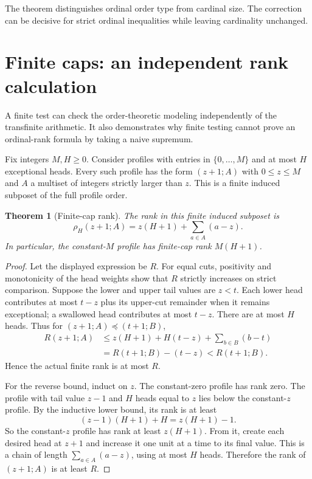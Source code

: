 \documentclass[11pt,a4paper]{article}
\newtheorem{theorem}{Theorem}[section]
\theoremstyle{definition}
\begin{document}
The theorem distinguishes ordinal order type from cardinal size. The correction can be decisive for strict ordinal inequalities while leaving cardinality unchanged.


\section{Finite caps: an independent rank calculation}\label{sec:finitecaps}

A finite test can check the order-theoretic modeling independently of the
transfinite arithmetic. It also demonstrates why finite testing cannot prove
an ordinal-rank formula by taking a naive supremum.

Fix integers $M,H\ge0$. Consider profiles with entries in $\{0,\ldots,M\}$
and at most $H$ exceptional heads. Every such profile has the form
$(z+1;A)$ with $0\le z\le M$ and $A$ a multiset of integers strictly larger
than $z$. This is a finite induced subposet of the full profile order.

\begin{theorem}[Finite-cap rank]\label{thm:finitecap}
The rank in this finite induced subposet is
\begin{equation}\label{eq:finitecap}
 \rho_H(z+1;A)=z(H+1)+\sum_{a\in A}(a-z).
\end{equation}
In particular, the constant-$M$ profile has finite-cap rank $M(H+1)$.
\end{theorem}
\begin{proof}
Let the displayed expression be $R$. For equal cuts, positivity and
monotonicity of the head weights show that $R$ strictly increases on strict
comparison. Suppose the lower and upper tail values are $z<t$.
Each lower head contributes at most $t-z$ plus its upper-cut remainder
when it remains exceptional; a swallowed head contributes at most $t-z$.
There are at most $H$ heads. Thus for $(z+1;A)\preceq(t+1;B)$,
\begin{align*}
 R(z+1;A)
 &\le z(H+1)+H(t-z)+\sum_{b\in B}(b-t)\\
 &=R(t+1;B)-(t-z)<R(t+1;B).
\end{align*}
Hence the actual finite rank is at most $R$.

For the reverse bound, induct on $z$. The constant-zero profile has rank
zero. The profile with tail value $z-1$ and $H$ heads equal to $z$ lies below
the constant-$z$ profile. By the inductive lower bound, its rank is at least
\[
 (z-1)(H+1)+H=z(H+1)-1.
\]
So the constant-$z$ profile has rank at least $z(H+1)$.
From it, create each desired head at $z+1$ and increase it one unit at a time
to its final value. This is a chain of length $\sum_{a\in A}(a-z)$, using at
most $H$ heads. Therefore the rank of $(z+1;A)$ is at least $R$.
\end{proof}
\end{document}
